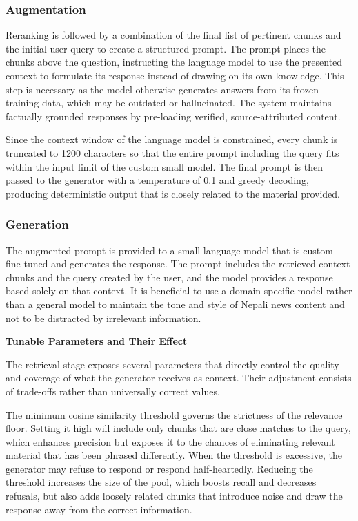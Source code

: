 \subsubsection{Augmentation}

Reranking is followed by a combination of the final list of pertinent chunks and the initial user query to create a structured prompt. The prompt places the chunks above the question, instructing the language model to use the presented context to formulate its response instead of drawing on its own knowledge. This step is necessary as the model otherwise generates answers from its frozen training data, which may be outdated or hallucinated. The system maintains factually grounded responses by pre-loading verified, source-attributed content.

Since the context window of the language model is constrained, every chunk is truncated to 1200 characters so that the entire prompt including the query fits within the input limit of the custom small model. The final prompt is then passed to the generator with a temperature of 0.1 and greedy decoding, producing deterministic output that is closely related to the material provided.

\subsubsection{Generation}

The augmented prompt is provided to a small language model that is custom fine-tuned and generates the response. The prompt includes the retrieved context chunks and the query created by the user, and the model provides a response based solely on that context. It is beneficial to use a domain-specific model rather than a general model to maintain the tone and style of Nepali news content and not to be distracted by irrelevant information.

\textbf{Tunable Parameters and Their Effect}

The retrieval stage exposes several parameters that directly control the quality and coverage of what the generator receives as context. Their adjustment consists of trade-offs rather than universally correct values.

The minimum cosine similarity threshold governs the strictness of the relevance floor. Setting it high will include only chunks that are close matches to the query, which enhances precision but exposes it to the chances of eliminating relevant material that has been phrased differently. When the threshold is excessive, the generator may refuse to respond or respond half-heartedly. Reducing the threshold increases the size of the pool, which boosts recall and decreases refusals, but also adds loosely related chunks that introduce noise and draw the response away from the correct information.

